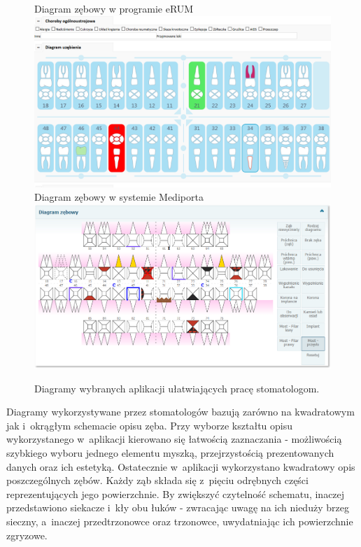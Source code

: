 \begin{figure}[t!]
\centering
\subfloat Diagram zębowy w programie eRUM\cite{eRUM}{\label{odnosnik}
\includegraphics[width=\textwidth]{figures/eRum.png}}
\quad
\subfloat Diagram zębowy w systemie Mediporta\cite{Mediporta}{\label{odnosnik}
\includegraphics[width=\textwidth]{figures/mediporta.png}}
\caption{Diagramy wybranych aplikacji ułatwiających pracę stomatologom.}
\label{fig:diagramy}
\end{figure}

Diagramy wykorzystywane przez stomatologów bazują zarówno na kwadratowym jak i~okrągłym schemacie opisu zęba. Przy wyborze kształtu opisu wykorzystanego w~aplikacji kierowano się łatwością zaznaczania - możliwością szybkiego wyboru jednego elementu myszką, przejrzystością prezentowanych danych oraz ich estetyką. Ostatecznie w~aplikacji wykorzystano kwadratowy opis poszczególnych zębów. Każdy ząb składa się z~pięciu odrębnych części reprezentujących jego powierzchnie. By zwiększyć czytelność schematu, inaczej przedstawiono siekacze i~kły obu łuków - zwracając uwagę na ich nieduży brzeg sieczny, a~inaczej przedtrzonowce oraz trzonowce, uwydatniając ich powierzchnie zgryzowe.

